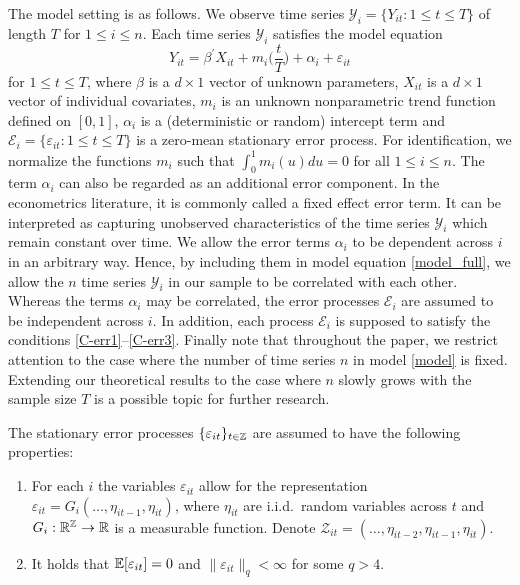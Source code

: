 \documentclass[a4paper,12pt]{article}
\begin{document}
The model setting is as follows. We observe time series $\mathcal{Y}_i = \{Y_{it}: 1 \le t \le T \}$ of length $T$ for $1 \le i \le n$. Each time series $\mathcal{Y}_i$ satisfies the model equation \begin{equation}\label{model_full}
Y_{it} = \beta^\prime X_{it} + m_i \Big( \frac{t}{T} \Big) + \alpha_i + \varepsilon_{it} 
\end{equation}
for $1 \le t \le T$, where $\beta$ is a $d \times 1$ vector of unknown parameters, $X_{it}$ is a $d\times 1$ vector of individual covariates, $m_i$ is an unknown nonparametric trend function defined on $[0,1]$, $\alpha_i$ is a (deterministic or random) intercept term and $\mathcal{E}_i = \{ \varepsilon_{it}: 1 \le t \le T \}$ is a zero-mean stationary error process. For identification, we normalize the functions $m_i$ such that $\int_0^1 m_i(u) du = 0$ for all $1 \le i \le n$. The term $\alpha_i$ can also be regarded as an additional error component. In the econometrics literature, it is commonly called a fixed effect error term. It can be interpreted as capturing unobserved characteristics of the time series $\mathcal{Y}_i$ which remain constant over time. We allow the error terms $\alpha_i$ to be dependent across $i$ in an arbitrary way. Hence, by including them in model equation \eqref{model_full}, we allow the $n$ time series $\mathcal{Y}_i$ in our sample to be correlated with each other. Whereas the terms $\alpha_i$ may be correlated, the error processes $\mathcal{E}_i$ are assumed to be independent across $i$. In addition, each process $\mathcal{E}_i$ is supposed to satisfy the conditions \ref{C-err1}--\ref{C-err3}. Finally note that throughout the paper, we restrict attention to the case where the number of time series $n$ in model \eqref{model} is fixed. Extending our theoretical results to the case where $n$ slowly grows with the sample size $T$ is a possible topic for further research.

The stationary error processes $\{\varepsilon_{it}\}_{t\in\mathbb{Z}}$ are assumed to have the following properties: 
\begin{enumerate}[label=(C\arabic*),leftmargin=1.05cm]

\item \label{C-err1} For each $i$ the variables $\varepsilon_{it}$ allow for the representation $\varepsilon_{it} = G_i(\ldots,\eta_{it-1},\eta_{it})$, where $\eta_{it}$ are i.i.d.\ random variables across $t$ and $G_i: \mathbb{R}^{\mathbb{Z}} \rightarrow \mathbb{R}$ is a measurable function. Denote $\mathcal{Z}_{it} = (\ldots,\eta_{it-2},\eta_{it-1},\eta_{it})$.

\item \label{C-err2} It holds that $\mathbb{E}[\varepsilon_{it}] =0$ and $\| \varepsilon_{it} \|_q < \infty$ for some $q > 4$. 

\end{enumerate}
\end{document}
